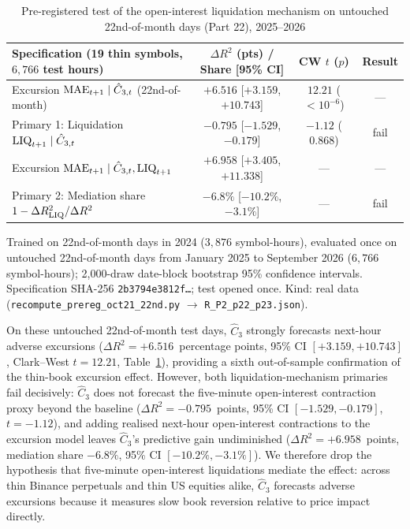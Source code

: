 \begin{table}[!tbp]\centering\footnotesize
\begin{threeparttable}
\caption{Pre-registered test of the open-interest liquidation mechanism on untouched 22nd-of-month days (Part 22), 2025--2026}\label{tab:p22}
\setlength{\tabcolsep}{1.8pt}
\begin{tabular}{lccc}
\toprule
Specification (19 thin symbols, $6{,}766$ test hours) & $\Delta R^2$ (pts) / Share [95\% CI] & CW $t$ ($p$) & Result\\
\midrule
Excursion ${\rm MAE}_{t+1}\mid\hat C_{3,t}$ (22nd-of-month) & $+6.516$ [$+3.159$, $+10.743$] & $12.21$ ($<10^{-6}$) & ---\\
Primary 1: Liquidation ${\rm LIQ}_{t+1}\mid\hat C_{3,t}$ & $-0.795$ [$-1.529$, $-0.179$] & $-1.12$ ($0.868$) & fail\\
Excursion ${\rm MAE}_{t+1}\mid\hat C_{3,t},{\rm LIQ}_{t+1}$ & $+6.958$ [$+3.405$, $+11.338$] & --- & ---\\
Primary 2: Mediation share $1-\Delta R^2_{\rm LIQ}/\Delta R^2$ & $-6.8\%$ [$-10.2\%$, $-3.1\%$] & --- & fail\\
\bottomrule
\end{tabular}
\begin{tablenotes}\footnotesize\item Trained on 22nd-of-month days in 2024 ($3{,}876$ symbol-hours), evaluated once on untouched 22nd-of-month days from January 2025 to September 2026 ($6{,}766$ symbol-hours); 2{,}000-draw date-block bootstrap 95\% confidence intervals. Specification SHA-256 \texttt{2b3794e3812f\ldots}; test opened once. Kind: real data (\texttt{recompute\_prereg\_oct21\_22nd.py} $\to$ \texttt{R\_P2\_p22\_p23.json}).\end{tablenotes}
\end{threeparttable}
\end{table}

On these untouched 22nd-of-month test days, $\hat C_3$ strongly forecasts next-hour adverse excursions ($\Delta R^2=+6.516$~percentage points, 95\% CI $[+3.159,+10.743]$, Clark--West $t=12.21$, Table~\ref{tab:p22}), providing a sixth out-of-sample confirmation of the thin-book excursion effect. However, both liquidation-mechanism primaries fail decisively: $\hat C_3$ does not forecast the five-minute open-interest contraction proxy beyond the baseline ($\Delta R^2=-0.795$~points, 95\% CI $[-1.529,-0.179]$, $t=-1.12$), and adding realised next-hour open-interest contractions to the excursion model leaves $\hat C_3$'s predictive gain undiminished ($\Delta R^2=+6.958$~points, mediation share $-6.8\%$, 95\% CI $[-10.2\%,-3.1\%]$). We therefore drop the hypothesis that five-minute open-interest liquidations mediate the effect: across thin Binance perpetuals and thin US equities alike, $\hat C_3$ forecasts adverse excursions because it measures slow book reversion relative to price impact directly.

